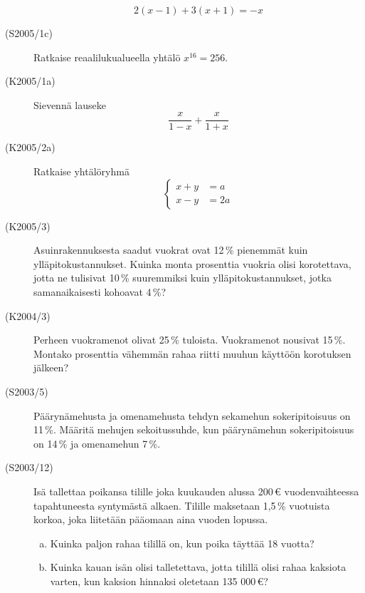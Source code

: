 \begin{description}
                        \[ 2(x - 1) + 3(x + 1 ) = -x \]
    \item[(S2005/1c)]  Ratkaise reaalilukualueella yhtälö $ x^{16} = 256 $.
    \item[(K2005/1a)]  Sievennä lauseke
                        \[ \frac{x}{1 - x} + \frac{x}{1 + x} \]
    \item[(K2005/2a)]  Ratkaise yhtälöryhmä
                        \[
                         \left\{
                         \begin{aligned}
                              x + y &= a \\
                              x - y &= 2a
                         \end{aligned}
                         \right.
                        \]
    \item[(K2005/3)]   Asuinrakennuksesta saadut vuokrat ovat 12\,\% pienemmät kuin
                        ylläpitokustannukset. Kuinka monta prosenttia vuokria olisi
                        korotettava, jotta ne tulisivat 10\,\% suuremmiksi kuin 
                        ylläpitokustannukset, jotka samanaikaisesti kohoavat 4\,\%?
    \item[(K2004/3)]   Perheen vuokramenot olivat 25\,\% tuloista. Vuokramenot nousivat
                        15\,\%. Montako prosenttia vähemmän rahaa riitti muuhun
                        käyttöön korotuksen jälkeen?
    \item[(S2003/5)]   Päärynämehusta ja omenamehusta tehdyn sekamehun sokeripitoisuus
                        on 11\,\%. Määritä mehujen sekoitussuhde, kun päärynämehun
                        sokeripitoisuus on 14\,\% ja omenamehun 7\,\%.
    \item[(S2003/12)]  Isä tallettaa poikansa tilille joka kuukauden alussa 200\,\euro \;
                        vuodenvaihteessa tapahtuneesta syntymästä alkaen. Tilille
                        maksetaan 1,5\,\% vuotuista korkoa, joka liitetään pääomaan aina 
                        vuoden lopussa.
                       
                        \begin{enumerate}[(a)]
                           \item Kuinka paljon rahaa tilillä on, kun poika täyttää
                                18 vuotta? 
                           \item Kuinka kauan isän olisi talletettava, jotta tilillä
                                olisi rahaa kaksiota varten, kun kaksion hinnaksi
                                oletetaan 135 000\,\euro ?
                        \end{enumerate}
                       

\end{description}
